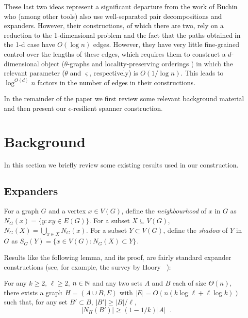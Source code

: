 \documentclass{patmorin}
\begin{document}
These last two ideas represent a significant departure from the work of
Buchin \etal\ \cite{buchin.har-peled.ea:spanner} who 
(among other tools) also use well-separated
pair decompositions and expanders.  However, their constructions, of
which there are two, rely on a reduction to the 1-dimensional problem
and the fact that the paths obtained in the 1-d case have $O(\log n)$ edges.
However, they have very little fine-grained control over the lengths of
these edges, which requires them to construct a $d$-dimensional object
($\theta$-graphs  \cite{keil.gutwin:classes} and locality-preserving orderings \cite{chan.har-peled.ea:on}) in which the relevant
parameter ($\theta$ and $\varsigma$, respectively) is $O(1/\log n)$.  This leads
to $\log^{O(d)} n$ factors in the number of edges in their constructions.

In the remainder of the paper we first review some relevant background material and then present our $\epsilon$-resilient spanner construction.

\section{Background}

In this section we briefly review some existing results used in our
construction.

\subsection{Expanders}

For a graph $G$ and a vertex $x\in V(G)$, define the \emph{neighbourhood}
of $x$ in $G$ as $N_G(x) = \{ y: xy\in E(G)\}$.  For a subset $X\subseteq
V(G)$, $N_G(X)=\bigcup_{x\in X} N_G(x)$.  For a subset $Y\subset
V(G)$, define the \emph{shadow} of $Y$ in $G$ as $S_G(Y) = \{x\in V(G):
N_G(X)\subset Y\}$.

Results like the following lemma, and its proof, are fairly standard
expander constructions (see, for example, the survey by Hoory \etal\
\cite{hoory.linial.ea:expanders}):

\begin{lem}
   For any $k\ge 2$, $\ell\ge 2$, $n\in\mathbb{N}$ and any two sets $A$ and $B$
   each of size $\Theta(n)$, there exists a graph $H=(A\cup B,E)$
   with $|E|=O(n(k\log \ell + \ell\log k))$ such that, for any set $B'\subset B$, $|B'|\ge |B|/\ell$, \[ |N_H(B')| \ge (1-1/k)|A| \enspace . \]
\end{lem}
\end{document}
